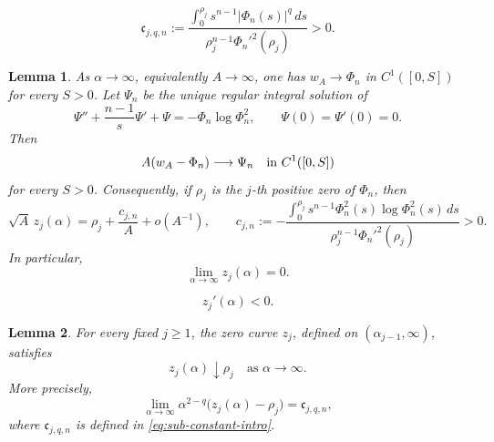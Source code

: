 \documentclass[10pt,a4paper]{amsart}
\newtheorem{lemma}{Lemma}
\begin{document}
\begin{equation}\label{eq:sub-constant-intro}
 \mathfrak c_{j,q,n}
 :=\frac{\displaystyle\int_0^{\rho_j}
 s^{n-1}|\Phi_n(s)|^q\,ds}
 {\rho_j^{n-1}\Phi_n'^2(\rho_j)}>0.
\end{equation}

\begin{lemma}\label{lem:log-bessel}
As $\alpha\to\infty$, equivalently $A\to\infty$, one has
$w_A\to\Phi_n$ in $C^1([0,S])$ for every $S>0$. Let $\Psi_n$ be the
unique regular integral solution of
\begin{equation}\label{eq:log-second-profile}
 \Psi''+\frac{n-1}{s}\Psi'+\Psi
 =-\Phi_n\log\Phi_n^2,
 \qquad \Psi(0)=\Psi'(0)=0.
\end{equation}
Then
\begin{equation}\label{eq:log-second-profile-convergence}
 A(w_A-\Phi_n)\longrightarrow\Psi_n
 \quad\hbox{in }C^1([0,S])
\end{equation}
for every $S>0$. Consequently, if $\rho_j$ is the $j$-th positive zero
of $\Phi_n$, then
\begin{equation}\label{eq:zeroasymptotic}
 \sqrt A\,z_j(\alpha)
 =\rho_j+\frac{c_{j,n}}{A}+o(A^{-1}),
 \qquad
 c_{j,n}:=-\frac{\displaystyle\int_0^{\rho_j}
 s^{n-1}\Phi_n^2(s)\log\Phi_n^2(s)\,ds}
 {\rho_j^{n-1}\Phi_n'^2(\rho_j)}>0.
\end{equation}
In particular,
\begin{equation}\label{eq:z-zero}
 \lim_{\alpha\to\infty}z_j(\alpha)=0.
\end{equation}
\end{lemma}

\begin{equation}
 z_{j}'(\alpha)<0.
 \label{eq:zero-curve-derivative}
\end{equation}

\begin{lemma}
\label{lem:sublinear-bessel-limit}
For every fixed $j\ge1$, the zero curve \(z_j\), defined on
\((\alpha_{j-1},\infty)\), satisfies
\begin{equation}
 z_j(\alpha)\downarrow\rho_j
 \quad\text{as }\alpha\to\infty.
 \label{eq:sublinear-right-limit-general}
\end{equation}
More precisely,
\begin{equation}
 \lim_{\alpha\to\infty}\alpha^{2-q}\bigl(z_j(\alpha)-\rho_j\bigr)
 = \mathfrak c_{j,q,n},
 \label{eq:sublinear-first-order-zero}
\end{equation}
where $\mathfrak c_{j,q,n}$ is defined in
\eqref{eq:sub-constant-intro}.
\end{lemma}
\end{document}

